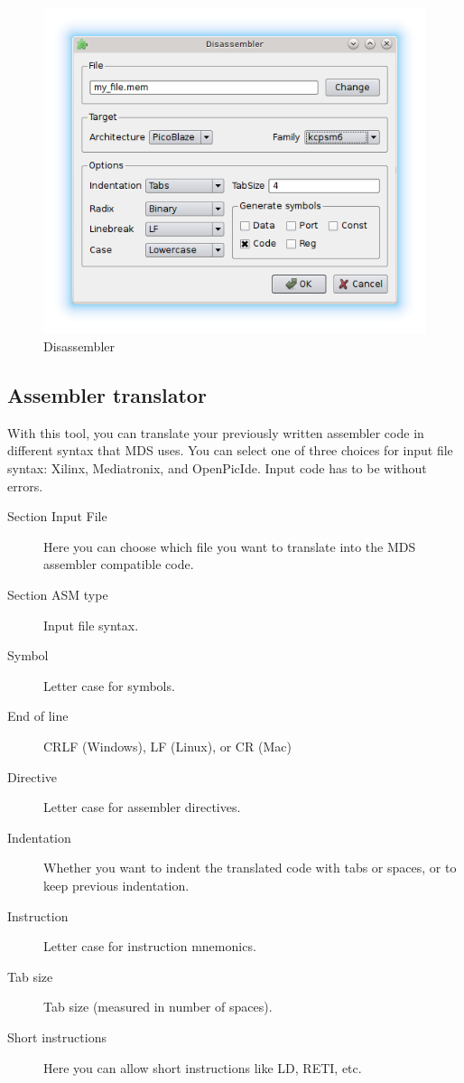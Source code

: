         \begin{figure}[h]
            \centering
            \includegraphics[width=.5\textwidth]{img/disassembler_window.png}
            \caption{Disassembler}
        \end{figure}

\clearpage
    \subsection{Assembler translator}
        With this tool, you can translate your previously written assembler code in different syntax that MDS uses. You can select one of three choices for input file syntax: Xilinx, Mediatronix, and OpenPicIde. Input code has to be without errors.

        \begin{description}
            \item[Section Input File] Here you can choose which file you want to translate into the MDS assembler compatible code.
            \item[Section ASM type] Input file syntax.
            \item[Symbol] Letter case for symbols.
            \item[End of line] CRLF (Windows), LF (Linux), or CR (Mac)
            \item[Directive] Letter case for assembler directives.
            \item[Indentation] Whether you want to indent the translated code with tabs or spaces, or to keep previous indentation.
            \item[Instruction] Letter case for instruction mnemonics.
            \item[Tab size] Tab size (measured in number of spaces).
            \item[Short instructions] Here you can allow short instructions like LD, RETI, etc.
        \end{description}

